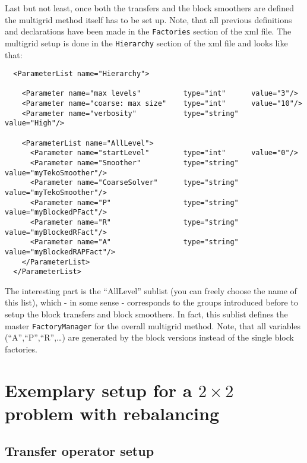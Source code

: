 \documentclass[10pt,fleqn]{book}
\begin{document}
Last but not least, once both the transfers and the block smoothers are defined the multigrid method itself has to be set up.
Note, that all previous definitions and declarations have been made in the \texttt{Factories} section of the xml file. The multigrid setup is done in the \texttt{Hierarchy} section of the xml file and looks like that:

\begin{lstlisting}
  <ParameterList name="Hierarchy">

    <Parameter name="max levels"          type="int"      value="3"/>
    <Parameter name="coarse: max size"    type="int"      value="10"/>
    <Parameter name="verbosity"           type="string"   value="High"/>

    <ParameterList name="AllLevel">
      <Parameter name="startLevel"        type="int"      value="0"/>
      <Parameter name="Smoother"          type="string"   value="myTekoSmoother"/>
      <Parameter name="CoarseSolver"      type="string"   value="myTekoSmoother"/>
      <Parameter name="P"                 type="string"   value="myBlockedPFact"/>
      <Parameter name="R"                 type="string"   value="myBlockedRFact"/>
      <Parameter name="A"                 type="string"   value="myBlockedRAPFact"/>
    </ParameterList>
  </ParameterList>
\end{lstlisting}

The interesting part is the ``AllLevel'' sublist (you can freely choose the name of this list), which - in some sense - corresponds to the groups introduced before to setup the block transfers and block smoothers. In fact, this sublist defines the master \texttt{FactoryManager} for the overall multigrid method. Note, that all variables (``A'',``P'',``R'',\ldots) are generated by the block versions instead of the single block factories.


\section{Exemplary setup for a $2\times 2$ problem with rebalancing}

\subsection{Transfer operator setup}
\end{document}
